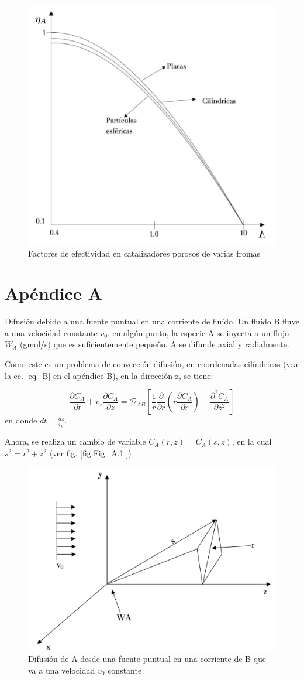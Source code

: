 \begin{figure}[H]
    \centering
    \includegraphics[width=0.7\linewidth]{Capitulo2/Imagenes/Fig_2.13.png}
    \caption{Factores de efectividad en catalizadores porosos de varias fromas}
    \label{fig:fig_2.13}
\end{figure}
\newpage
\section*{Apéndice A}
\renewcommand{\thefigure}{A.\arabic{figure}}
\setcounter{figure}{0}
\renewcommand{\theequation}{A.\arabic{equation}} 
\setcounter{equation}{0}
Difusión debido a una fuente puntual en una corriente de fluído.
Un fluido B fluye a una velocidad constante $v_0$. en algún punto, la especie A se inyecta a un flujo $W_A$ (gmol/s) que es suficientemente pequeño. A se difunde axial y radialmente.

Como este es un problema de convección-difusión, en coordenadas cilíndricas (vea la ec. \eqref{eq_B} en el apéndice B), en la dirección z, se tiene:

\begin{equation}
    \frac{\partial C_A}{\partial t}+v_z\frac{\partial C_A}{\partial z}=\mathscr{D}_{AB}\left[\frac{1}{r}\frac{\partial }{\partial r}\left(r\frac{\partial C_A}{\partial r}\right)+\frac{\partial ^2C_A}{\partial z^2}\right]
\end{equation}
en donde $dt=\frac{dz}{v_0}$.

Ahora, se realiza un cambio de variable $C_A(r,z)=C_A(s,z)$, en la cual $s^2=r^2+z^2$ (ver fig. \eqref{fig:Fig_A.1.})
\begin{figure}[H]
    \centering
    \includegraphics[width=0.5\linewidth]{Capitulo2/Imagenes/Fig_A.1.png}
    \caption{Difusión de A desde una fuente puntual en una corriente de B que va a una velocidad $v_0$ constante}
    \label{fig:Fig_A.1.}
\end{figure}

